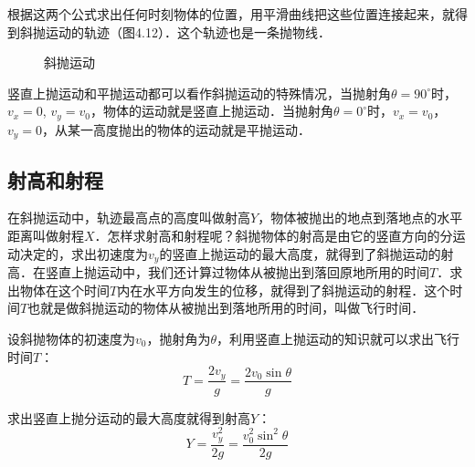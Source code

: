 根据这两个公式求出任何时刻物体的位置，用平滑曲线把这些位置连接起来，就得到斜抛运动的轨迹（图4.12）．这个轨迹也是一条抛物线．

\begin{figure}[H]\centering
    \caption{斜抛运动}
\end{figure}


竖直上抛运动和平抛运动都可以看作斜抛运动的特殊情况，当抛射角$\theta=90^{\circ}$时，$v_x=0$, $v_y=v_0$，物体的运动就是竖直上抛运动．当抛射角$\theta =0^{\circ}$时，$v_x=v_0$，$v_y=0$，从某一高度抛出的物体的运动就是平抛运动．

\subsection{射高和射程}

在斜抛运动中，轨迹最高点的高度叫做射高$Y$，物体被抛出的地点到落地点的水平距离叫做射程$X$．怎样求射高和射程呢？斜抛物体的射高是由它的竖直方向的分运动决定的，求出初速度为$v_y$的竖直上抛运动的最大高度，就得到了斜抛运动的射高．在竖直上抛运动中，我们还计算过物体从被抛出到落回原地所用的时间$T$．求出物体在这个时间$T$内在水平方向发生的位移，就得到了斜抛运动的射程．这个时间$T$也就是做斜抛运动的物体从被抛出到落地所用的时间，叫做飞行时间．

设斜抛物体的初速度为$v_0$，抛射角为$\theta$，利用竖直上抛运动的知识就可以求出飞行时间$T$：
\begin{equation}
    T=\frac{2v_y}{g}=\frac{2v_0\sin\theta}{g}
\end{equation}

求出竖直上抛分运动的最大高度就得到射高$Y$：
\begin{equation}
    Y=\frac{v^2_y}{2g}=\frac{v_0^2\sin^2\theta}{2g}
\end{equation}

